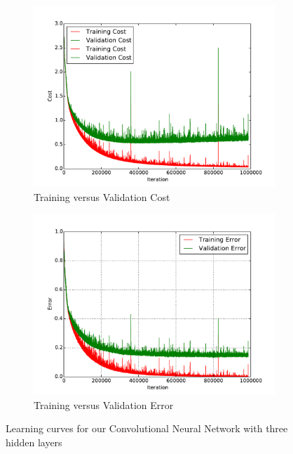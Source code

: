 \begin{figure}
	\centering
	\begin{subfigure}[b]{0.45\linewidth}
		\centering
		\includegraphics[width=\linewidth]{images/3/train_val_cost.pdf}
		\caption{Training versus Validation Cost}
	\end{subfigure}
	\hfill
	\begin{subfigure}[b]{0.45\linewidth}
		\centering
		\includegraphics[width=\linewidth]{images/3/train_val_error.pdf}
		\caption{Training versus Validation Error}
	\end{subfigure}
	\caption{Learning curves for our Convolutional Neural Network with three hidden layers }
	\label{cnn_plot}
\end{figure}
